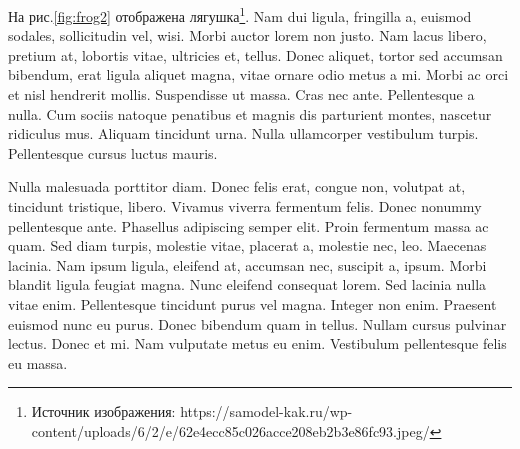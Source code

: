 На рис.\ref{fig:frog2} отображена лягушка\footnote{Источник изображения: {https://samodel-kak.ru/wp-content/uploads/6/2/e/62e4ecc85c026acce208eb2b3e86fc93.jpeg/}}. Nam dui ligula, fringilla a, euismod sodales, sollicitudin vel, wisi. Morbi auctor lorem non justo. Nam lacus libero, pretium at, lobortis vitae, ultricies et, tellus. Donec aliquet, tortor sed accumsan bibendum, erat ligula aliquet magna, vitae ornare odio metus a mi. Morbi ac orci et nisl hendrerit mollis. Suspendisse ut massa. Cras nec ante. Pellentesque a nulla. Cum sociis natoque penatibus et magnis dis parturient montes, nascetur ridiculus mus. Aliquam tincidunt urna. Nulla ullamcorper vestibulum turpis. Pellentesque cursus luctus mauris.

Nulla malesuada porttitor diam. Donec felis erat, congue non, volutpat at, tincidunt tristique, libero. Vivamus viverra fermentum felis. Donec nonummy pellentesque ante. Phasellus adipiscing semper elit. Proin fermentum massa ac quam. Sed diam turpis, molestie vitae, placerat a, molestie nec, leo. 
Maecenas lacinia. Nam ipsum ligula, eleifend at, accumsan nec, suscipit a, ipsum. Morbi blandit ligula feugiat magna. Nunc eleifend consequat lorem. Sed lacinia nulla vitae enim. Pellentesque tincidunt purus vel magna. Integer non enim. Praesent euismod nunc eu purus. Donec bibendum quam in tellus. Nullam cursus pulvinar lectus. Donec et mi. Nam vulputate metus eu enim. Vestibulum 
pellentesque felis eu massa.
\clearpage

